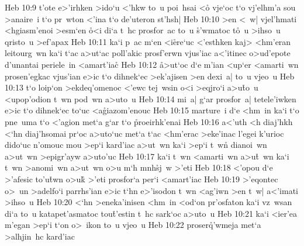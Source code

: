 \vs Heb 10:9
t'ote
e>'irhken
>ido`u
<'hkw
to~u
poi~hsai
<o\r{}
vje`oc
t`o
vj'elhm'a
sou
>anaire~i
t`o
pr~wton
<'ina
t`o
de'uteron
st'hsh|\bibvsend
\vs Heb 10:10
>en
<~w|
vjel'hmati
<hgiasm'enoi
>esm`en
\r{o}<i
di`a
t~hc
prosfor~ac
to~u
\r{s}'wmatoc
t\r{o}~u
>ihso~u
qristo~u
>ef'apax\bibvsend
\vs Heb 10:11
ka`i
p~ac
m`en
<i\r{e}re`uc
<'esthken
kaj>
<hm'eran
leitourg~wn
ka`i
t`ac
a>ut`ac
poll'akic
prosf'erwn
vjus'iac
a<'itinec
o>ud'epote
d'unantai
periele~in
<amart'ia\r{c}\bibvsend
{}
\vs Heb 10:12
\r{a}>ut`oc
d`e
m'ian
<up`er
<amarti~wn
prosen'egkac
vjus'ian
e>ic
t`o
dihnek`ec
>ek'ajisen
>en
dexi~a|
to~u
vjeo~u\bibvsend
\vs Heb 10:13
t`o
loip`on
>ekdeq'omenoc
<'ewc
tej~wsin
o<i
>eqjro`i
a>u\r{t}o~u
<upop'odion
t~wn
pod~wn
a>uto~u\bibvsend
\vs Heb 10:14
mi~a|
g`ar
prosfor~a|
tetele'iwken
e>ic
t`o
dihnek`ec
to`uc
<a\r{g}iazom'enouc\bibvsend
{}
\vs Heb 10:15
marture~i
d`e
<hm~in
ka`i
t`o
pne~uma
t`o
<'agion
met`a
g`ar
t`o
\r{p}roeirhk'enai\bibvsend
{}
\vs Heb 10:16
a<'uth
<h
diaj'hkh
<`hn
diaj'hsomai
pr`oc
a>uto`uc
met`a
t`ac
<hm'erac
>eke'inac
l'egei
k'urioc
dido`uc
n'omouc
mou
>ep`i
kard'iac
a>ut~wn
ka`i
>ep`i
t~wn\r{}
dianoi~wn
a>ut~wn
>epigr'ayw
a>uto'uc\bibvsend
\vs Heb 10:17
ka`i
t~wn
<amarti~wn
a>u\r{t}~wn
ka`i
t~wn
>anomi~wn
a>ut~wn
o>u
m`h
mnh\r{s}j~w
>'eti\bibvsend
\vs Heb 10:18
<'opou
d`e
>'afesic
to'u\r{t}wn
o>uk\r{}
>'eti
prosfor`a
per`i
<amart'iac\bibvsend
\vs Heb 10:19
>'eqontec
o>~un
>adelfo`i
parrhs'ian
e>ic
t`hn
e>'isodon
t~wn
<ag'iwn
>en
t~w|
a<'imati
>ihso~u\bibvsend
\vs Heb 10:20
<`hn
>eneka'inisen
<hm~in
<od`on
pr'osfaton
ka`i
vz~wsan
di`a
to~u
katapet'asmatoc
tou\r{t}'estin
t~hc
sark`oc
a>uto~u\bibvsend
\vs Heb 10:21
ka`i
<ier'ea
m'egan
>ep`i
t`on
o>~ikon
to~u
vjeo~u\bibvsend
\vs Heb 10:22
proser\r{q}'wmeja
met`a
>alhjin~hc
kard'iac
